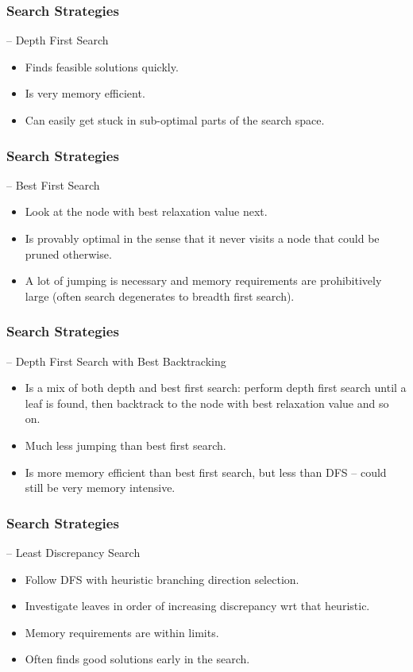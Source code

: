 \documentclass{beamer}
\begin{document}
\begin{frame}
	\frametitle{Search Strategies}
	
	– Depth First Search
	\begin{itemize}
		\item Finds feasible solutions quickly.
		\item Is very memory efficient.
		\item Can easily get stuck in sub-optimal parts of the
		search space.
	\end{itemize}
\end{frame}
\begin{frame}
	\frametitle{Search Strategies}
	– Best First Search
	\begin{itemize}
		\item Look at the node with best relaxation value next.
		\item Is provably optimal in the sense that it never visits a
		node that could be pruned otherwise.
		\item A lot of jumping is necessary and memory
		requirements are prohibitively large (often search
		degenerates to breadth first search).
	\end{itemize}
\end{frame}
\begin{frame}
	\frametitle{Search Strategies}
	– Depth First Search with Best Backtracking
	\begin{itemize}
		\item Is a mix of both depth and best first search: perform depth first
		search until a leaf is found, then backtrack to the node with best
		relaxation value and so on.
		\item Much less jumping than best first search.
		\item Is more memory efficient than best first search, but less than
		DFS – could still be very memory intensive.
	\end{itemize}
\end{frame}
\begin{frame}
	\frametitle{Search Strategies}
	
	– Least Discrepancy Search
	\begin{itemize}
		\item Follow DFS with heuristic branching direction selection.
		\item Investigate leaves in order of increasing discrepancy wrt that
		heuristic.
		\item Memory requirements are within limits.
		\item Often finds good solutions early in the search.
	\end{itemize}
\end{frame}
\end{document}
